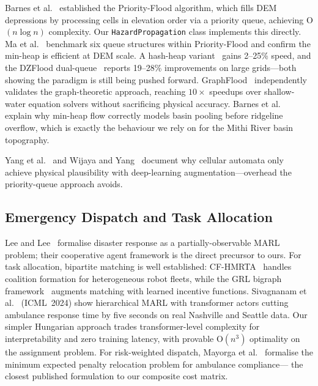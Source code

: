 \documentclass[conference]{IEEEtran}
\begin{document}
Barnes et al.~\cite{barnes2014priority} established the Priority-Flood
algorithm, which fills DEM depressions by processing cells in elevation order
via a priority queue, achieving O$(n \log n)$ complexity.
Our \texttt{HazardPropagation} class implements this directly.
Ma et al.~\cite{ma2025evaluation} benchmark six queue structures within
Priority-Flood and confirm the min-heap is efficient at DEM scale.
A hash-heap variant~\cite{ma2026modified} gains 2--25\% speed, and the
DZFlood dual-queue~\cite{wu2025efficient} reports 19--28\% improvements on
large grids---both showing the paradigm is still being pushed forward.
GraphFlood~\cite{gailleton2024graphflood} independently validates the
graph-theoretic approach, reaching $10\times$ speedups over shallow-water
equation solvers without sacrificing physical accuracy.
Barnes et al.~\cite{barnes2020hierarchies} explain why min-heap flow correctly
models basin pooling before ridgeline overflow, which is exactly the behaviour
we rely on for the Mithi River basin topography.

Yang et al.~\cite{yang2024cnn} and Wijaya and Yang~\cite{wijaya2021combining}
document why cellular automata only achieve physical plausibility with
deep-learning augmentation---overhead the priority-queue approach avoids.

\subsection{Emergency Dispatch and Task Allocation}

Lee and Lee~\cite{lee2020marl} formalise disaster response as a
partially-observable MARL problem; their cooperative agent framework is
the direct precursor to ours.
For task allocation, bipartite matching is well established:
CF-HMRTA~\cite{bachler2022cfhmrta} handles coalition formation for
heterogeneous robot fleets, while the GRL bigraph framework~\cite{prorok2023bigraph}
augments matching with learned incentive functions.
Sivagnanam et al.~\cite{sivagnanam2024marl} (ICML~2024) show hierarchical
MARL with transformer actors cutting ambulance response time by five seconds
on real Nashville and Seattle data.
Our simpler Hungarian approach trades transformer-level complexity for
interpretability and zero training latency, with provable O$(n^3)$ optimality
on the assignment problem.
For risk-weighted dispatch, Mayorga et al.~\cite{mayorga2013penalty} formalise
the minimum expected penalty relocation problem for ambulance compliance---
the closest published formulation to our composite cost matrix.
\end{document}
